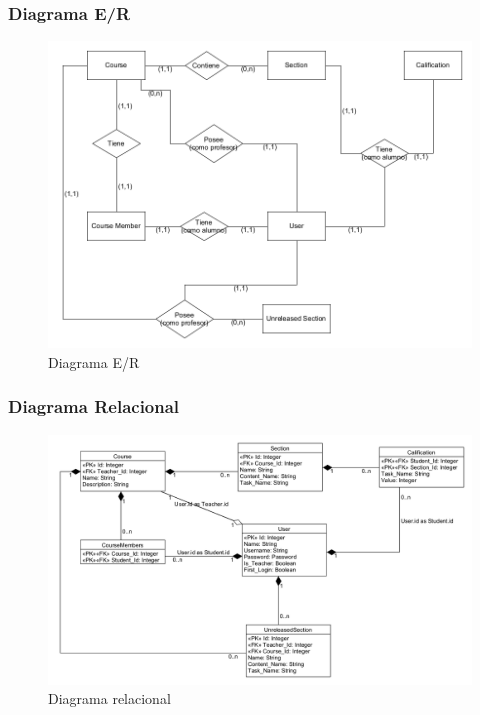 \begin{itemize}
\subsubsection{Diagrama E/R}
\begin{figure}[H]
    \centering
    \includegraphics[width=\textwidth]{img/imgs-memoria/BD_DiagramaER.png}
    \caption{Diagrama E/R}
\end{figure}


\subsubsection{Diagrama Relacional}
\begin{figure}[H]
    \centering
    \includegraphics[width=\textwidth]{img/imgs-memoria/BD_DiagramaRelacional.png}
    \caption{Diagrama relacional}
\end{figure}


\end{itemize}

